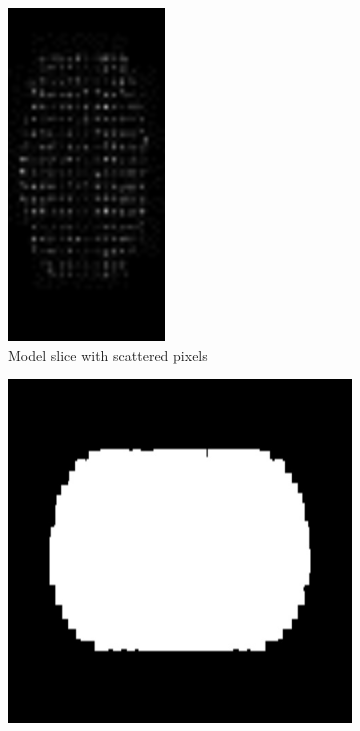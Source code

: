 \begin{figure}[!t]
	\centering
	\begin{subfigure}[t]{0.35\linewidth}
		\centering
		\includegraphics[width=\linewidth, height=\linewidth]{Figures/ObjRecog/slices/bathtub_original}
        \caption{Model slice with scattered pixels}
        \label{fig:dilation_a}
	\end{subfigure}
	\quad
	\begin{subfigure}[t]{0.35\linewidth}
		\centering
		\includegraphics[width=\linewidth, height=\linewidth]{Figures/ObjRecog/slices/bathtub_dilated}

\end{subfigure}
\end{figure}
